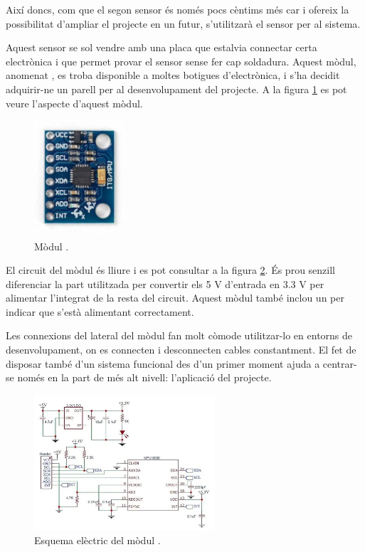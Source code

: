 Així doncs, com que el segon sensor és només pocs cèntims més car i ofereix
la possibilitat d'ampliar el projecte en un futur, s'utilitzarà el sensor
 per al sistema.

Aquest sensor se sol vendre amb una placa que estalvia connectar
certa electrònica i que permet provar el sensor sense fer cap soldadura.
Aquest mòdul, anomenat , es troba disponible a moltes botigues
d'electrònica, i s'ha decidit adquirir-ne un parell per al desenvolupament del
projecte. A la figura \ref{fig:gy521img} es pot veure l'aspecte d'aquest mòdul.

\begin{figure}[ht]
    \centering
    \includegraphics[width=0.3\textwidth]{images/modules/gy521img.jpg}
    \caption{Mòdul  \cite{gy521}.}
    \label{fig:gy521img}
\end{figure}

El circuit del mòdul  és lliure i es pot consultar a la figura
\ref{fig:gy521sch}. És prou senzill diferenciar la part utilitzada per
convertir els 5 V d'entrada en 3.3 V per alimentar l'integrat de la resta
del circuit. Aquest mòdul també inclou un  per indicar que s'està
alimentant correctament.

Les connexions del lateral del mòdul fan molt còmode utilitzar-lo en entorns de
desenvolupament, on es connecten i desconnecten cables constantment. El fet
de disposar també d'un sistema funcional des d'un primer moment ajuda a
centrar-se només en la part de més alt nivell: l'aplicació del projecte.

\begin{figure}[ht]
    \centering
    \includegraphics[width=0.6\textwidth]{images/modules/gy521sch.png}
    \caption{Esquema elèctric del mòdul  \cite{gy521}.}
    \label{fig:gy521sch}
\end{figure}

